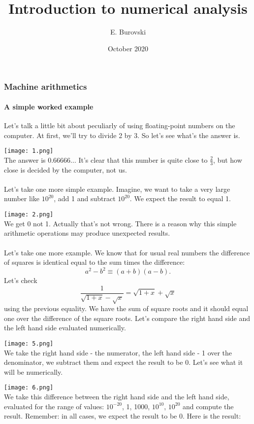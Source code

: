 \documentclass{article}
\title{Introduction to numerical analysis}
\author{E. Burovski}
\date{October 2020}
\begin{document}
\maketitle

\part{}
\section{Machine arithmetics}
\subsection{A simple worked example}

Let's talk a little bit about peculiarly of using floating-point numbers on the computer.
At first, we'll try to divide 2 by 3. So let's see what's the answer is.

\texttt{[image: 1.png]}\\
The answer is 0.66666... It's clear that this number is quite close to \(\frac{2}{3}\), but how close is decided by the computer, not us.\\
\\Let's take one more simple example. Imagine, we want to take a very large number like \(10^{20}\), add 1 and subtract \(10^{20}\). We expect the result to equal 1.

\texttt{[image: 2.png]}\\
We get 0 not 1. Actually that's not wrong. There is a reason why
this simple arithmetic operations
may produce unexpected results.\\
\\Let's take one more example. We know that for usual real numbers the difference of squares is identical equal to the sum times the difference:
\[
a^2-b^2 \equiv (a+b)(a-b).
\]
Let’s check \[\frac{1}{\sqrt{1+x}-\sqrt{x}}=\sqrt{1+x}+\sqrt{x}\] using the previous equality.
We have the sum of square roots and it should equal one over the difference of the square roots. Let's compare the right hand side and the left hand side evaluated numerically.

\texttt{[image: 5.png]}\\
We take the right hand side -  the numerator, the left hand side - 1 over the denominator, we subtract them and expect the result to be 0. Let's see what it will be numerically.

\texttt{[image: 6.png]}\\
We take this difference between the right hand side and the left hand side, evaluated for the range of values: \(10^{-20}\), 1, 1000, \(10^{10}\), \(10^{20}\) and compute the result. Remember: in all cases, we expect the result to be 0. Here is the result:
\end{document}
